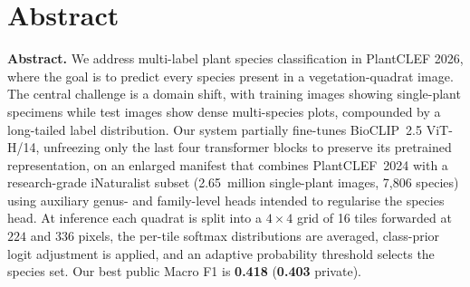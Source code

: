 \ifLongThesisStyle
\chapter*{Abstract}
\else%
\par\bigskip\textbf{Abstract.}
\fi
%
We address multi-label plant species classification in PlantCLEF 2026,
where the goal is to predict every species present in a vegetation-quadrat
image. The central challenge is a domain shift, with training images
showing single-plant specimens while test images show dense multi-species
plots, compounded by a long-tailed label distribution. Our system
partially fine-tunes BioCLIP~2.5 ViT-H/14, unfreezing only the last four
transformer blocks to preserve its pretrained representation, on an
enlarged manifest that combines PlantCLEF~2024 with a research-grade
iNaturalist subset (2.65~million single-plant images, 7{,}806 species)
using auxiliary genus- and family-level heads intended to regularise the
species head. At inference each quadrat is split into a $4{\times}4$ grid
of 16 tiles forwarded at $224$ and $336$ pixels, the per-tile softmax
distributions are averaged, class-prior logit adjustment is applied, and
an adaptive probability threshold selects the species set. Our best
public Macro F1 is \textbf{0.418} (\textbf{0.403} private).

